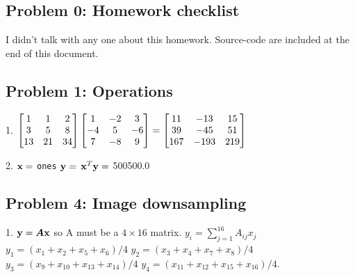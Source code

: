 \documentclass{article}
\begin{document}
 



\hypertarget{problem_0_homework_checklist_2}{}\subsection*{{Problem 0: Homework checklist}}\label{problem_0_homework_checklist_2}

\checkmark	I didn't talk with any one about this homework. \newline
\checkmark 	Source-code are included at the end of this document. 


\hypertarget{problem_1_operations_3}{}\subsection*{{Problem 1: Operations}}\label{problem_1_operations_3}



1. $\begin{bmatrix}  1 & 1 & 2 \\ 3 & 5 & 8 \\ 13 & 21 & 34  \end{bmatrix} \begin{bmatrix}  1 & -2 & 3 \\ -4 & 5 & -6 \\ 7 & -8 & 9 \end{bmatrix} =\begin{bmatrix} 11 & -13 & 15 \\ 39 & -45 & 51 \\ 167 & -193 & 219 \end{bmatrix}$ \newline

2. $\boldsymbol{\mathrm{x}} =$ {\colorbox[rgb]{1.00,0.93,1.00}{\tt ones}} $\boldsymbol{\mathrm{y}} =$ {\colorbox[rgb]{1.00,0.93,1.00}{\tt {}}} $\boldsymbol{\mathrm{x}}^T \boldsymbol{\mathrm{y}} =$ 500500.0 \newline


\hypertarget{problem_4_image_downsampling_6}{}\subsection*{{Problem 4: Image downsampling}}\label{problem_4_image_downsampling_6}

1.%
$\boldsymbol{\mathrm{y}} = \boldsymbol{A}\boldsymbol{\mathrm{x}} $
so A must be a $4\times 16$ matrix.  $ y_i= \sum_{j=1}^{16}A_{ij}x_j  $ \\
$ y_1 = (x_1 + x_2 + x_5 + x_6)/4 $ \newline
$ y_2 = (x_3 + x_4 + x_7 + x_8)/4   $ \newline
$ y_3 = (x_9 + x_{10} + x_{13} + x_{14})/4 $ \newline
$ y_4 = (x_{11} + x_{12} + x_{15} + x_{16})/4.$ \newline
\end{document}
